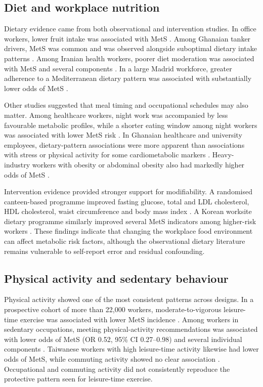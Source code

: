 \documentclass[11pt]{article}
\begin{document}
\subsection{Diet and workplace nutrition}

Dietary evidence came from both observational and intervention studies. In office workers, lower fruit intake was associated with MetS \citep{Alavi2015}. Among Ghanaian tanker drivers, MetS was common and was observed alongside suboptimal dietary intake patterns \citep{Apprey2022}. Among Iranian health workers, poorer diet moderation was associated with MetS and several components \citep{Sharifi2025}. In a large Madrid workforce, greater adherence to a Mediterranean dietary pattern was associated with substantially lower odds of MetS \citep{ReinosoBarbero2026}.

Other studies suggested that meal timing and occupational schedules may also matter. Among healthcare workers, night work was accompanied by less favourable metabolic profiles, while a shorter eating window among night workers was associated with lower MetS risk \citep{dosReis2026}. In Ghanaian healthcare and university employees, dietary-pattern associations were more apparent than associations with stress or physical activity for some cardiometabolic markers \citep{Ayeltigah2026Healthcare,Ayeltigah2026University}. Heavy-industry workers with obesity or abdominal obesity also had markedly higher odds of MetS \citep{Petek2026}.

Intervention evidence provided stronger support for modifiability. A randomised canteen-based programme improved fasting glucose, total and LDL cholesterol, HDL cholesterol, waist circumference and body mass index \citep{Ma2025}. A Korean worksite dietary programme similarly improved several MetS indicators among higher-risk workers \citep{Kim2016Dietary}. These findings indicate that changing the workplace food environment can affect metabolic risk factors, although the observational dietary literature remains vulnerable to self-report error and residual confounding.

\subsection{Physical activity and sedentary behaviour}

Physical activity showed one of the most consistent patterns across designs. In a prospective cohort of more than 22,000 workers, moderate-to-vigorous leisure-time exercise was associated with lower MetS incidence \citep{Kuwahara2016}. Among workers in sedentary occupations, meeting physical-activity recommendations was associated with lower odds of MetS (OR 0.52, 95\% CI 0.27--0.98) and several individual components \citep{Browne2017}. Taiwanese workers with high leisure-time activity likewise had lower odds of MetS, while commuting activity showed no clear association \citep{Huang2017Taiwan}. Occupational and commuting activity did not consistently reproduce the protective pattern seen for leisure-time exercise.
\end{document}
